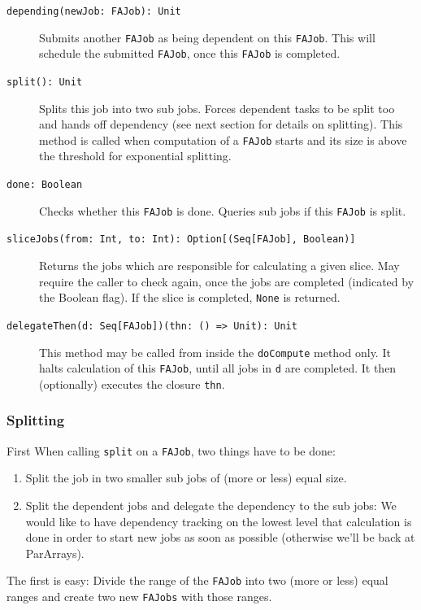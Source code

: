 \documentclass[runningheads,a4paper,fleqn]{llncs}
\begin{document}
\begin{description}
  \item[\texttt{depending(newJob: FAJob): Unit}] Submits another \texttt{FAJob} as being
    dependent on this \texttt{FAJob}. This will schedule the submitted
    \texttt{FAJob}, once this \texttt{FAJob} is completed.
  \item[\texttt{split(): Unit}] Splits this job into two
    sub jobs. Forces dependent tasks to be split too and hands off
    dependency (see next section for details on splitting). This
    method is called when computation of a \texttt{FAJob} starts and
    its size is above the threshold for exponential splitting.
  \item[\texttt{done: Boolean}] Checks whether this \texttt{FAJob} is
    done. Queries sub jobs if this \texttt{FAJob} is split.
  \item[\texttt{sliceJobs(from: Int, to: Int): Option[(Seq[FAJob],
      Boolean)]}] Returns the jobs which are responsible for
    calculating a given slice. May require the caller to check again,
    once the jobs are completed (indicated by the Boolean flag). If
    the slice is completed, \texttt{None} is returned.
  \item[\texttt{delegateThen(d: Seq[FAJob])(thn: () => Unit): Unit}]
    This method may be called from inside the \texttt{doCompute}
    method only. It halts calculation of this \texttt{FAJob}, until
    all jobs in \texttt{d} are completed. It then (optionally)
    executes the closure \texttt{thn}.
\end{description}

\subsubsection{Splitting}
First
When calling \texttt{split} on a \texttt{FAJob}, two things have to be
done:
\begin{enumerate}
\item Split the job in two smaller sub jobs of (more or less) equal
  size.
\item Split the dependent jobs and delegate the dependency to the
  sub jobs: We would like to have dependency tracking on the lowest
  level that calculation is done in order to start new jobs as soon as
  possible (otherwise we'll be back at ParArrays).
\end{enumerate}

The first is easy: Divide the range of the \texttt{FAJob} into two
(more or less) equal ranges and create two new \texttt{FAJobs} with
those ranges.
\end{document}
